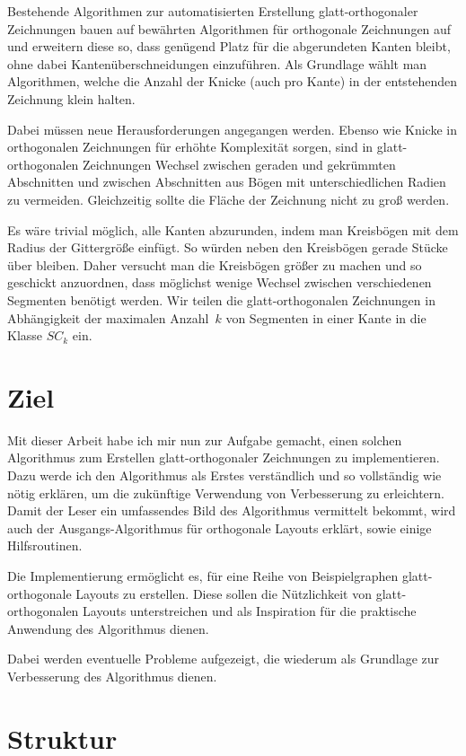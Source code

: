\documentclass[a4paper]{scrreprt}
\theoremstyle{definition}
\newcommand{\go}{glatt-or\-tho\-go\-nal}
\begin{document}
Bestehende Algorithmen zur automatisierten Erstellung glatt-orthogonaler Zeichnungen bauen auf bewährten Algorithmen für orthogonale Zeichnungen auf und erweitern diese so, dass genügend Platz für die abgerundeten Kanten bleibt, ohne dabei Kantenüberschneidungen einzuführen. Als Grundlage wählt man Algorithmen, welche die Anzahl der Knicke (auch pro Kante) in der entstehenden Zeichnung klein halten. 

Dabei müssen neue Herausforderungen angegangen werden. Ebenso wie Knicke in orthogonalen Zeichnungen für erhöhte Komplexität sorgen, sind in glatt-orthogonalen Zeichnungen Wechsel zwischen geraden und gekrümmten Abschnitten und zwischen Abschnitten aus Bögen mit unterschiedlichen Radien zu vermeiden. Gleichzeitig sollte die Fläche der Zeichnung nicht zu groß werden.

Es wäre trivial möglich, alle Kanten abzurunden, indem man Kreisbögen mit dem Radius der Gittergröße einfügt. So würden neben den Kreisbögen gerade Stücke über bleiben. Daher versucht man die Kreisbögen größer zu machen und so geschickt anzuordnen, dass möglichst wenige Wechsel zwischen verschiedenen Segmenten benötigt werden. Wir teilen die glatt-orthogonalen Zeichnungen in Abhängigkeit der maximalen Anzahl~$k$ von Segmenten in einer Kante in die Klasse $SC_k$ ein. 

\section{Ziel}

Mit dieser Arbeit habe ich mir nun zur Aufgabe gemacht, einen solchen Algorithmus zum Erstellen glatt-orthogonaler Zeichnungen zu implementieren. Dazu werde ich den Algorithmus als Erstes verständlich und so vollständig wie nötig erklären, um die zukünftige Verwendung von Verbesserung zu erleichtern. Damit der Leser ein umfassendes Bild des Algorithmus vermittelt bekommt, wird auch der Ausgangs-Algorithmus für orthogonale Layouts erklärt, sowie einige Hilfsroutinen. 

Die Implementierung ermöglicht es, für eine Reihe von Beispielgraphen \go e Layouts zu erstellen. Diese sollen die Nützlichkeit von glatt-orthogonalen Layouts unterstreichen und als Inspiration für die praktische Anwendung des Algorithmus dienen.

Dabei werden eventuelle Probleme aufgezeigt, die wiederum als Grundlage zur Verbesserung des Algorithmus dienen. 

\section{Struktur}
\end{document}
